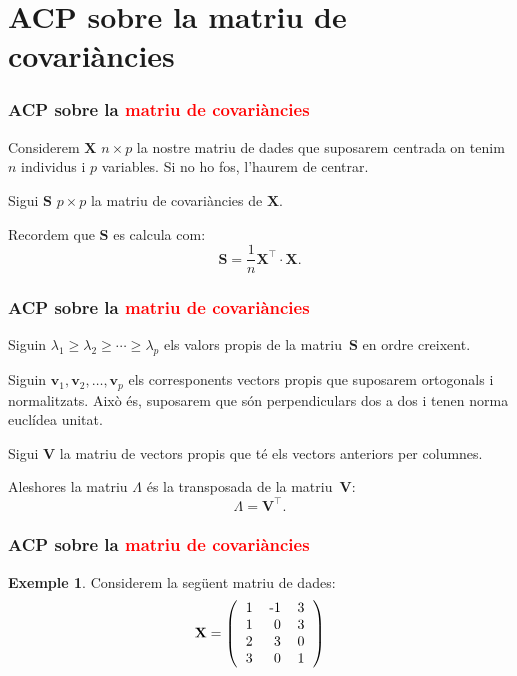\documentclass[12pt,t]{beamer}
\newcommand{\red}[1]{\textcolor{red}{#1}}
\renewcommand{\geq}{\geqslant}
\theoremstyle{plain}
\theoremstyle{definition}
\newtheorem{exemple}{Exemple}
\begin{document}
\section{ACP sobre la matriu de covariàncies}

\begin{frame}
\frametitle{ACP sobre la \red{matriu de covariàncies}}
Considerem $\mathbf{X}$ $n\times p$ la nostre matriu de dades que suposarem centrada on tenim $n$ individus i $p$ 
variables. Si no ho fos, l'haurem de centrar.
\bigskip

Sigui $\mathbf{S}$ $p\times p$ la matriu de covariàncies de $\mathbf{X}$.
\medskip

Recordem que $\mathbf{S}$ es calcula com:
\[
\mathbf{S}=\frac{1}{n}\mathbf{X}^\top\cdot\mathbf{X}.
\]

\end{frame}

\begin{frame}
\frametitle{ACP sobre la \red{matriu de covariàncies}}
Siguin $\lambda_1 \geq \lambda_2 \geq \cdots \geq \lambda_p$ els valors propis de la matriu~$\mathbf{S}$ en ordre 
creixent.
\medskip

Siguin $\mathbf{v}_1,\mathbf{v}_2,\ldots,\mathbf{v}_p$ els corresponents vectors propis que suposarem ortogonals i 
normalitzats. Això és, suposarem que són perpendiculars dos a dos i tenen norma euclídea unitat.
\medskip

Sigui $\mathbf{V}$ la matriu de vectors propis que té els vectors anteriors per columnes.
\medskip

Aleshores la matriu $\Lambda$ és la transposada de la matriu~$\mathbf{V}$: 
\[
\Lambda=\mathbf{V}^\top.
\]
\end{frame}

\begin{frame}[fragile]
\frametitle{ACP sobre la \red{matriu de covariàncies}}
\begin{exemple}
Considerem la següent matriu de dades:
\[
\mathbf{X}= 
\left(
\begin{tabular}{rrr}
  1 & -1 & 3 \\ 
  1 & 0 & 3 \\ 
  2 & 3 & 0 \\ 
  3 & 0 & 1 \\ 
  \end{tabular}\right)
\]

\end{exemple}
\end{frame}
\end{document}
